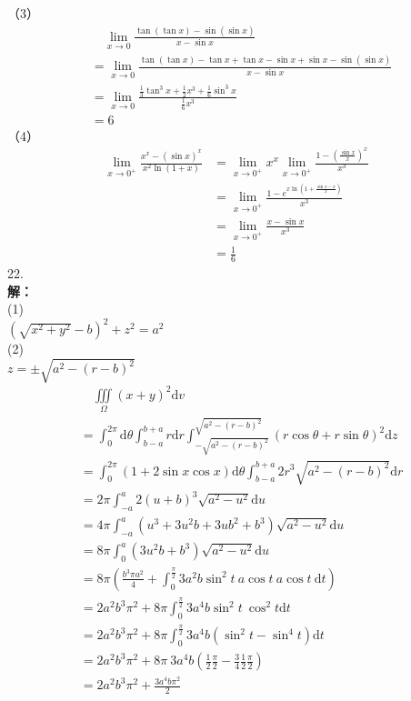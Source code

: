 \documentclass[a4paper]{article}
\begin{document}
（3）\\
\begin{align*}
	&\quad\lim\limits_{x \to 0} \frac{\tan(\tan x)-\sin(\sin x)}{x-\sin x}\\&= \lim \limits_{x \to 0} \frac{\tan(\tan x) -\tan x +\tan x -\sin x + \sin x -\sin(\sin x)}{x-\sin x}\\
	&=\lim \limits_{x\to 0}\frac{\frac{1}{3}\tan^3 x +\frac{1}{2}x^3 +\frac{1}{6}\sin^3 x}{\frac{1}{6}x^3}\\
	&=6
\end{align*}
（4）\\
\begin{align*}
	\lim\limits_{x\to 0^{+}} \frac{x^x -(\sin x)^x}{x^2\ln(1+x)}&=
	\lim\limits_{x\to 0^{+}} x^x \lim\limits_{x\to 0^{+}} \frac{1-(\frac{\sin x}{x})^x}{x^3}\\
	&=\lim\limits_{x\to 0^{+}} \frac{1-e^{x\ln(1+\frac{\sin x - x}{x})}}{x^3}\\
	&=\lim\limits_{x\to 0^{+}} \frac{x-\sin x}{x^3}\\
	&=\frac{1}{6}
\end{align*}
22.\\
\textbf{解：}\\
(1)\\
$(\sqrt{x^2+y^2}-b)^2+z^2=a^2$\\
(2)\\
$z=\pm \sqrt{a^2-(r-b)^2}$
\begin{align*}
    &\quad \iiint\limits_{\Omega}(x+y)^2\mathrm{d}v\\
    &=\int_{0}^{2\pi} \mathrm{d} \theta \int_{b-a}^{b+a} r\mathrm{d}r\int_{-\sqrt{a^2-(r-b)^2}}^{\sqrt{a^2-(r-b)^2}} (r\cos\theta+r\sin \theta)^2\mathrm{d}z\\
    &=\int_{0}^{2\pi}(1+2\sin x\cos x)\mathrm{d}\theta \int_{b-a}^{b+a} 2r^3\sqrt{a^2-(r-b)^2}\mathrm{d} r\\
    &=2\pi \int_{-a}^{a}2(u+b)^3\sqrt{a^2-u^2}\mathrm{d}u\\
    &=4\pi\int_{-a}^{a}(u^3+3u^2b+3ub^2+b^3)\sqrt{a^2-u^2}\mathrm{d}u\\
    &=8\pi\int_{0}^{a}(3u^2b+b^3)\sqrt{a^2-u^2}\mathrm{d}u\\
    &=8\pi(\frac{b^3\pi a^2}{4}+\int_{0}^{\frac{\pi}{2}}3a^2 b\sin^2 t\ a\cos t\ a\cos t\ \mathrm{d} t)\\
    &=2a^2 b^3\pi^2+8\pi \int_{0}^{\frac{\pi}{2}} 3a^4b \sin^2 t\ \cos^2 t \mathrm{d}t\\
    &=2a^2 b^3\pi^2+8\pi \int_{0}^{\frac{\pi}{2}} 3a^4b (\sin^2 t-\sin^4 t)\mathrm{d}t\\
    &=2a^2 b^3\pi^2+8\pi\ 3a^4b(\frac{1}{2}\frac{\pi}{2}-\frac{3}{4}\frac{1}{2}\frac{\pi}{2})\\
    &=2a^2 b^3\pi^2+\frac{3a^4 b \pi^2}{2}
\end{align*}
\end{document}
